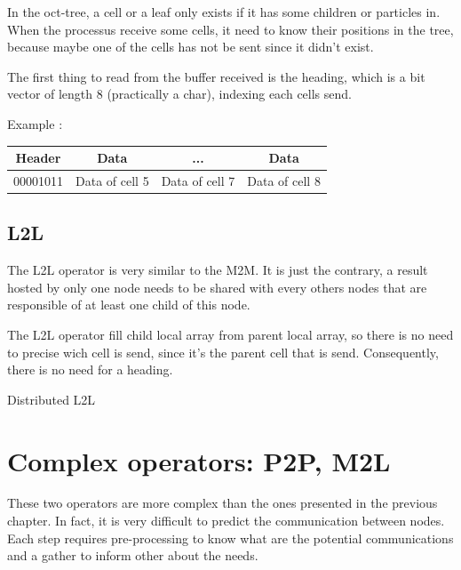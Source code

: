 \documentclass[12pt,letterpaper,titlepage]{report}
\begin{document}
In the oct-tree, a cell or a leaf only exists if it has some children
or particles in. When the processus receive some cells, it need to
know their positions in the tree, because maybe one of the cells has
not be sent since it didn't exist.

The first thing to read from the buffer received is the heading, which
is a bit vector of length 8 (practically a char), indexing each cells
send.


Example :
\begin{tabular}{| c || c | c | c |}
  \hline
  Header & Data & ... & Data \\
  \hline
  00001011 & Data of cell 5 & Data of cell 7 & Data of cell 8 \\
  \hline
\end{tabular}


\clearpage
\section{L2L}
The L2L operator is very similar to the M2M.  It is just the contrary,
a result hosted by only one node needs to be shared with every others
nodes that are responsible of at least one child of this node.

The L2L operator fill child local array from parent local array, so
there is no need to precise wich cell is send, since it's the parent
cell that is send. Consequently, there is no need for a heading.

\BlankLine
\begin{algorithm}[H]
  \LinesNumbered
  \SetAlgoLined
  \BlankLine
  \BlankLine
  \caption{Distributed L2L}
\end{algorithm}
\chapter{Complex operators: P2P, M2L}
These two operators are more complex than the ones presented in the previous chapter.
In fact, it is very difficult to predict the communication between nodes.
Each step requires pre-processing to know what are the potential communications and a gather to inform other about the needs.
\end{document}

